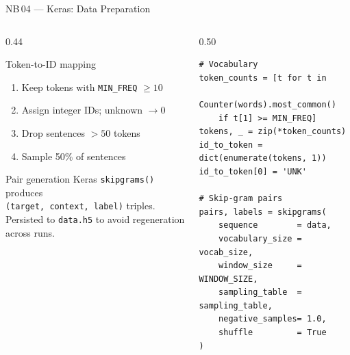 \documentclass[11pt,aspectratio=169,professionalfonts]{beamer}
\begin{document}
\begin{frame}[fragile]{NB\,04 — Keras: Data Preparation}

  \begin{columns}[T]
    \begin{column}{0.44\textwidth}
      \begin{block}{Token-to-ID mapping}
        \begin{enumerate}\small
          \item Keep tokens with \texttt{MIN\_FREQ} $\ge 10$
          \item Assign integer IDs; unknown $\to 0$
          \item Drop sentences $> 50$ tokens
          \item Sample 50\% of sentences
        \end{enumerate}
      \end{block}
      \vspace{0.5em}
      \begin{block}{Pair generation}
        \small
        Keras \texttt{skipgrams()} produces\\
        \texttt{(target, context, label)} triples.\\[0.3em]
        Persisted to \texttt{data.h5} to avoid
        regeneration across runs.
      \end{block}
    \end{column}
    \begin{column}{0.50\textwidth}
\scriptsize
\begin{lstlisting}
# Vocabulary
token_counts = [t for t in
    Counter(words).most_common()
    if t[1] >= MIN_FREQ]
tokens, _ = zip(*token_counts)
id_to_token = dict(enumerate(tokens, 1))
id_to_token[0] = 'UNK'

# Skip-gram pairs
pairs, labels = skipgrams(
    sequence        = data,
    vocabulary_size = vocab_size,
    window_size     = WINDOW_SIZE,
    sampling_table  = sampling_table,
    negative_samples= 1.0,
    shuffle         = True
)
\end{lstlisting}
    \end{column}
  \end{columns}

\end{frame}
%
%
\end{document}
